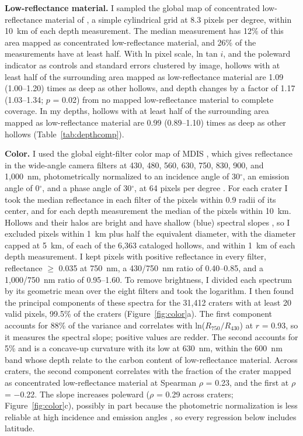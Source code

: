 \documentclass{planetary}
\begin{document}
\textbf{Low-reflectance material.} I sampled the global map of concentrated low-reflectance material of \textcite{klima2018}, a simple cylindrical grid at 8.3 pixels per degree, within 10~km of each depth measurement. The median measurement has 12\% of this area mapped as concentrated low-reflectance material, and 26\% of the measurements have at least half. With ln pixel scale, ln tan $i$, and the poleward indicator as controls and standard errors clustered by image, hollows with at least half of the surrounding area mapped as low-reflectance material are 1.09 (1.00--1.20) times as deep as other hollows, and depth changes by a factor of 1.17 (1.03--1.34; $p$ = 0.02) from no mapped low-reflectance material to complete coverage. In my depths, hollows with at least half of the surrounding area mapped as low-reflectance material are 0.99 (0.89--1.10) times as deep as other hollows (Table~\ref{tab:depthcomp}).

\textbf{Color.} \label{sec:colorS} I used the global eight-filter color map of MDIS \parencite{mdis_mdr}, which gives reflectance in the wide-angle camera filters at 430, 480, 560, 630, 750, 830, 900, and 1,000~nm, photometrically normalized to an incidence angle of 30$^\circ$, an emission angle of 0$^\circ$, and a phase angle of 30$^\circ$, at 64 pixels per degree \parencite{denevi2018}. For each crater I took the median reflectance in each filter of the pixels within 0.9 radii of its center, and for each depth measurement the median of the pixels within 10~km. Hollows and their halos are bright and have shallow (blue) spectral slopes \parencite{blewettMultispectralImagesMercury2009}, so I excluded pixels within 1~km plus half the equivalent diameter, with the diameter capped at 5~km, of each of the 6,363 cataloged hollows, and within 1~km of each depth measurement. I kept pixels with positive reflectance in every filter, reflectance $\geq$ 0.035 at 750~nm, a 430/750~nm ratio of 0.40--0.85, and a 1,000/750~nm ratio of 0.95--1.60. To remove brightness, I divided each spectrum by its geometric mean over the eight filters and took the logarithm. I then found the principal components of these spectra for the 31,412 craters with at least 20 valid pixels, 99.5\% of the craters (Figure~\ref{fig:color}a). The first component accounts for 88\% of the variance and correlates with ln($R_{750}/R_{430}$) at $r$ = 0.93, so it measures the spectral slope; positive values are redder. The second accounts for 5\% and is a concave-up curvature with its low at 630~nm, within the 600~nm band whose depth \textcite{klima2018} relate to the carbon content of low-reflectance material. Across craters, the second component correlates with the fraction of the crater mapped as concentrated low-reflectance material at Spearman $\rho$ = 0.23, and the first at $\rho$ = $-$0.22. The slope increases poleward ($\rho$ = 0.29 across craters; Figure~\ref{fig:color}c), possibly in part because the photometric normalization is less reliable at high incidence and emission angles \parencite{domingueMercurysGlobalColor2015}, so every regression below includes latitude.
\end{document}
